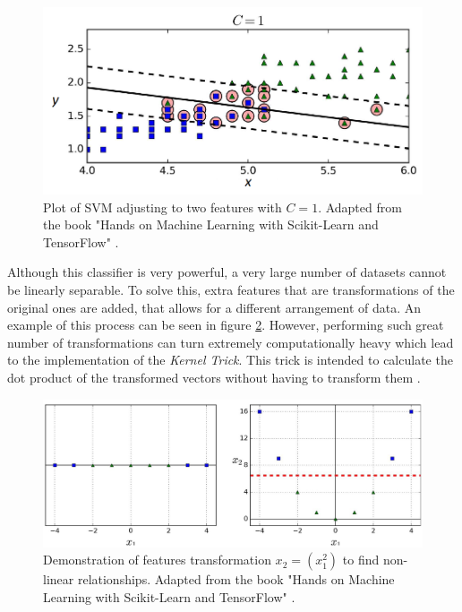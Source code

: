 \begin{figure}[h]
	\centering
	\includegraphics[width=\textwidth]{../images/results/linear_svm.png}
	\caption{Plot of \gls{SVM} adjusting to two features with $C=1$. Adapted from the book "Hands on Machine Learning with Scikit-Learn and TensorFlow" \cite{geron2017hands}.} 
	\label{fig:linear_svm}
\end{figure}

Although this classifier is very powerful, a very large number of datasets cannot be linearly separable. To solve this, extra features that are transformations of the original ones are added, that allows for a different arrangement of data. An example of this process can be seen in figure \ref{fig:svm}. However, performing such great number of transformations can turn extremely computationally heavy which lead to the implementation of the \textit{Kernel Trick}. This trick is intended to calculate the dot product of the transformed vectors without having to transform them \cite{geron2017hands}.

\begin{figure}[h]
	\centering
	\includegraphics[width=\textwidth]{../images/results/svm.png}
	\caption{Demonstration of features transformation $x_2 = (x_1^2) $ to find non-linear relationships. Adapted from the book "Hands on Machine Learning with Scikit-Learn and TensorFlow" \cite{geron2017hands}.} 
	\label{fig:svm}
\end{figure}

